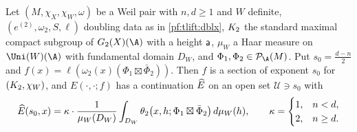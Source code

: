\begin{proposition}\label{pf:tlift:sw}
Let $(M,\chi_X,\chi_W,\omega)$ be a Weil pair with $n,d\ge1$ and $W$ definite, $(e^{(2)},\omega_2,S,\ell)$ doubling
data as in \cref{pf:tlift:dblx}, $K_2$ the standard maximal compact subgroup of $G_2(X)(\A)$ with a height
$\mathsf{a}$, $\mu_W$ a Haar measure on $\Uni(W)(\A)$ with fundamental domain $D_W$, and
$\Phi_1,\Phi_2\in\tliftPD(M)$. Put $s_0=\frac{d-n}2$ and $f(x)=\ell(\omega_2(x)(\Phi_1\boxtimes\bar\Phi_2))$. Then $f$
is a section of exponent $s_0$ for $(K_2,\chi_W)$, and $E(\cdot,\cdot;f)$ has a continuation $\widehat{E}$ on an
open set $\mathcal U\ni s_0$ with
\begin{equation}\label{eq:tlift:sw}
  \widehat{E}(s_0,x)=\kappa\cdot\frac1{\mu_W(D_W)}\int_{D_W}\theta_2\bigl(x,h;\Phi_1\boxtimes\bar\Phi_2\bigr)\,d\mu_W(h),
  \qquad\kappa=\begin{cases}1,&n<d,\\2,&n\ge d.\end{cases}
\end{equation}
\end{proposition}

